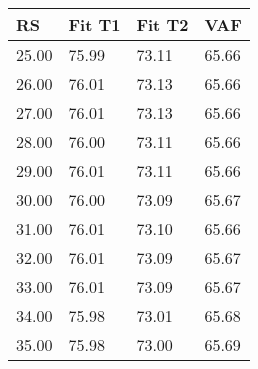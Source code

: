 \begin{tabular}{llll}
RS & Fit T1 & Fit T2 & VAF \\ 
\hline 
25.00 & 75.99 & 73.11 & 65.66 \\ 
26.00 & 76.01 & 73.13 & 65.66 \\ 
27.00 & 76.01 & 73.13 & 65.66 \\ 
28.00 & 76.00 & 73.11 & 65.66 \\ 
29.00 & 76.01 & 73.11 & 65.66 \\ 
30.00 & 76.00 & 73.09 & 65.67 \\ 
31.00 & 76.01 & 73.10 & 65.66 \\ 
32.00 & 76.01 & 73.09 & 65.67 \\ 
33.00 & 76.01 & 73.09 & 65.67 \\ 
34.00 & 75.98 & 73.01 & 65.68 \\ 
35.00 & 75.98 & 73.00 & 65.69 \\ 
\hline 
\end{tabular}